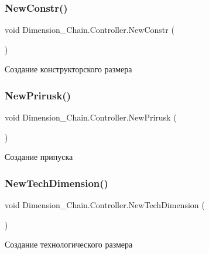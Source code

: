 \subsubsection{\texorpdfstring{New\+Constr()}{NewConstr()}}
{\footnotesize\ttfamily void Dimension\+\_\+\+Chain.\+Controller.\+New\+Constr (\begin{DoxyParamCaption}{ }\end{DoxyParamCaption})}



Создание конструкторского размера 

\mbox{\label{class_dimension___chain_1_1_controller_a5c809db2364ca8fd973b737cee2659b3}} 
\subsubsection{\texorpdfstring{New\+Prirusk()}{NewPrirusk()}}
{\footnotesize\ttfamily void Dimension\+\_\+\+Chain.\+Controller.\+New\+Prirusk (\begin{DoxyParamCaption}{ }\end{DoxyParamCaption})}



Создание припуска 

\mbox{\label{class_dimension___chain_1_1_controller_a9e7eca33518de3a62888f2a6272cdeb6}} 
\subsubsection{\texorpdfstring{New\+Tech\+Dimension()}{NewTechDimension()}}
{\footnotesize\ttfamily void Dimension\+\_\+\+Chain.\+Controller.\+New\+Tech\+Dimension (\begin{DoxyParamCaption}{ }\end{DoxyParamCaption})}





Создание технологического размера 

